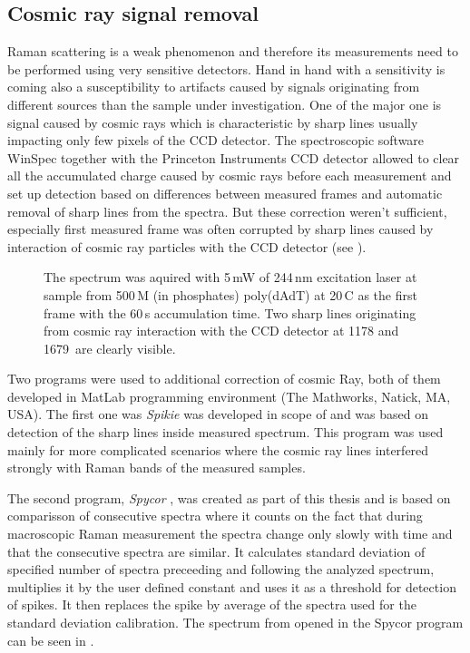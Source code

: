 \subsection{Cosmic ray signal removal}

Raman scattering is a weak phenomenon and therefore its measurements need to be
performed using very sensitive detectors.
Hand in hand with a sensitivity is coming also a susceptibility to artifacts
caused by signals originating from different sources than the sample under
investigation.
One of the major one is signal caused by cosmic rays which is characteristic
by sharp lines usually impacting only few pixels of the CCD detector.
The spectroscopic software WinSpec together with the Princeton Instruments
CCD detector allowed to clear all the accumulated charge caused by cosmic rays
before each measurement and set up detection based on differences between
measured frames and automatic removal of sharp lines from the spectra.
But these correction weren't sufficient, especially first measured frame
was often corrupted by sharp lines caused by interaction of cosmic ray
particles with the CCD detector
(see ).

\begin{figure}
	\centering
	
	\vspace{3mm}
	\caption[%
		UVRR pectrum containing cosmic ray signal.
	]{%
		The spectrum was aquired with 5\,mW of 244\,nm excitation laser at sample
		from 500\,M (in phosphates) poly(dAdT) at 20\,\textdegree{}C as the
		first frame with the 60\,s accumulation time.
		Two sharp lines originating from cosmic ray interaction with the CCD
		detector at 1178 and 1679\,\icm{} are clearly visible.
	}
	\label{\figlabel{cosmic_spikes:spectrum}}
\end{figure}

Two programs were used to additional correction of cosmic Ray, both of them
developed in MatLab programming environment (The Mathworks, Natick, MA, USA).
The first one was \emph{Spikie}
\parencite{Spikie2011}
was developed in scope of
\textcite{Klener2011}
and was based on detection of the sharp lines inside measured spectrum.
This program was used mainly for more complicated scenarios where the cosmic
ray lines interfered strongly with Raman bands of the measured samples.

The second program, \emph{Spycor}
\parencite{Spycor2018},
was created as part of this thesis and is based on comparisson of consecutive
spectra where it counts on the fact that during macroscopic Raman measurement
the spectra change only slowly with time and that the consecutive spectra are
similar.
It calculates standard deviation of specified number of spectra preceeding and
following the analyzed spectrum, multiplies it by the user defined constant
and uses it as a threshold for detection of spikes.
It then replaces the spike by average of the spectra used for the standard
deviation calibration. The spectrum from
opened in the Spycor program can be seen in
.

